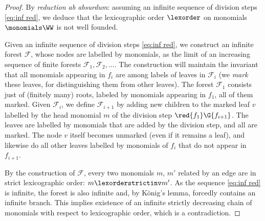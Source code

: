 \begin{proof} %
%
By \emph{reduction ab absurdum}:
assuming an infinite sequence of division steps \eqref{eq:inf red}, we deduce that
the lexicographic order $\lexorder$ on monomials $\monomials \WW$ is not well founded.
%
%

Given an infinite sequence of division steps \eqref{eq:inf red},
we construct an infinite forest $\mathcal F$, whose nodes are labelled by monomials,
as the limit of an increasing sequence of finite forests ${\mathcal F}_1, {\mathcal F}_2, \ldots$.
The construction will maintain the invariant that all monomials appearing in $f_i$ are
among labels of leaves in ${\mathcal F}_i$ (we \emph{mark} these leaves, %
for distinguishing them from other leaves).
The forest ${\mathcal F}_1$ consists just of (finitely many) roots, 
labeled by monomials appearing in $f_1$, all of them marked.
Given ${\mathcal F}_i$, we define ${\mathcal F}_{i+1}$ by adding new children to the 
marked leaf $v$ labelled by the head monomial $m$ of the division step $\red {f_1} \G {f_{i+1}}$.
The leaves are labelled by monomials that are added by the division step, and all are marked.
The node $v$ itself becomes unmarked (even if it remains a leaf), and likewise do all other 
leaves labelled by monomials of $f_i$ that do not appear in $f_{i+1}$.

By the construction of $\mathcal F$, every two monomials $m$, $m'$ related by an edge are in 
strict lexicographic order: $m \lexorderstrictinv m'$.
As the sequence \eqref{eq:inf red} is infinite, the forest is also infinite and, by K{\"o}nig's lemma,
forcedly contains an infinite branch. 
This implies existence of an infinite strictly decreasing chain of monomials
with respect to lexicographic order, which is a contradiction.
%
\end{proof}
%

